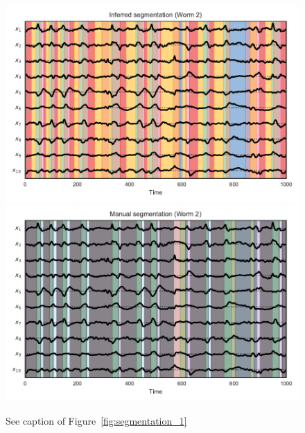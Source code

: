 \documentclass{article}
\begin{document}
\begin{figure}[h]
\centering%
\includegraphics[width=5.5in]{figures/arhmm/x_segmentation_1.pdf}
\includegraphics[width=5.5in]{figures/arhmm/x_segmentation_zimmer_1.pdf}
\caption{See caption of Figure~\ref{fig:segmentation_1}}
\label{fig:segmentation_2}
\end{figure}
\end{document}
